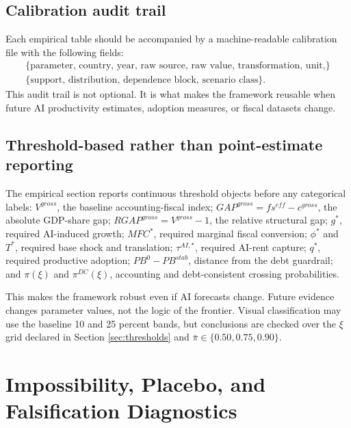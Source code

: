 \documentclass[11pt,a4paper]{article}
\begin{document}
\subsection{Calibration audit trail}

Each empirical table should be accompanied by a machine-readable calibration file with the following fields:
\begin{equation}
\begin{gathered}
    \{\text{parameter, country, year, raw source, raw value, transformation, unit,}\}\\
    \{\text{support, distribution, dependence block, scenario class}\}.
\end{gathered}
\end{equation}
This audit trail is not optional. It is what makes the framework reusable when future AI productivity estimates, adoption measures, or fiscal datasets change.

\subsection{Threshold-based rather than point-estimate reporting}

The empirical section reports continuous threshold objects before any categorical labels:
$V^{gross}$, the baseline accounting-fiscal index; $GAP^{gross}=fs^{eff}-c^{gross}$, the absolute GDP-share gap; $RGAP^{gross}=V^{gross}-1$, the relative structural gap; $g^*$, required AI-induced growth; $MFC^*$, required marginal fiscal conversion; $\phi^*$ and $T^*$, required base shock and translation; $\tau^{AI,*}$, required AI-rent capture; $q^*$, required productive adoption; $PB^0-PB^{stab}$, distance from the debt guardrail; and $\pi(\xi)$ and $\pi^{DC}(\xi)$, accounting and debt-consistent crossing probabilities.

This makes the framework robust even if AI forecasts change. Future evidence changes parameter values, not the logic of the frontier. Visual classification may use the baseline 10 and 25 percent bands, but conclusions are checked over the $\xi$ grid declared in Section \ref{sec:thresholds} and $\bar{\pi}\in\{0.50,0.75,0.90\}$.



\section{Impossibility, Placebo, and Falsification Diagnostics}\label{sec:impossibility_falsification}
\end{document}
